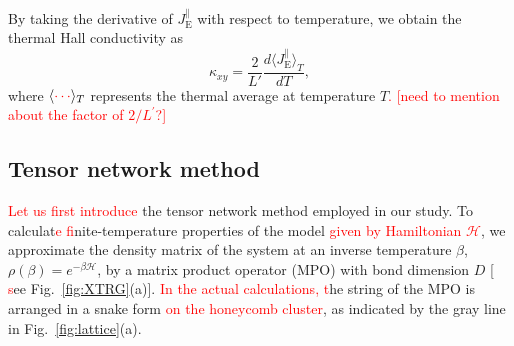 \documentclass[twocolumn,superscriptaddress,showpacs, longbibliography, aps, prb]{revtex4-2}
\newcommand{\red}[1]{\textcolor{red}{#1}}
\newcommand{\blue}[1]{\textcolor{blue}{#1}}
\newcommand{\orange}[1]{\textcolor{orange}{#1}}
\begin{document}
%
%
%
By taking the derivative of $J_{\mathrm{E}}^{\parallel}$ with respect to %
temperature, we obtain the thermal Hall conductivity as 
\begin{equation}
 \kappa_{xy}=\frac{2}{L'} \frac{d \langle J_{\mathrm{E}}^{\parallel}\rangle_{T}}{d T},
\label{eq:def_kxy}
\end{equation}
where $\langle %
\red{\cdots} \rangle_T$ represents the thermal average at %
temperature $T$\red{.} %
\red{[need to mention about the factor of $2/L^\prime$?]} 


\subsection{Tensor network method}\label{subsec:Tensor network method}
\red{Let us first introduce} the tensor network method %
employed in our study. 
To calculat\red{e %
f}inite-temperature properties of the model \red{given by Hamiltonian $\mathcal{H}$}, 
we approximate %
the density matrix of the system at an inverse temperature $\beta$, $\rho(\beta) = e^{-\beta\mathcal{H}}$, %
by a matrix product operator (MPO) with %
bond dimension $D$ [%
\red{s}ee Fig.~\ref{fig:XTRG}(a)]. \red{In the actual calculations, %
t}he string of the MPO is arranged in a snake form \red{on the honeycomb cluster}, %
as indicated by the gray line in Fig.~\ref{fig:lattice}(a). 
\end{document}
